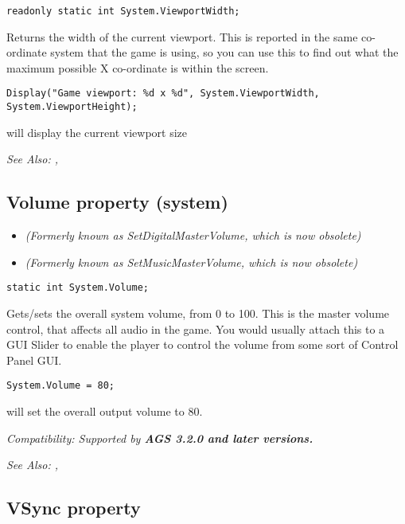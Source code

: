 \begin{verbatim}
readonly static int System.ViewportWidth;
\end{verbatim}
Returns the width of the current viewport. This is reported in the same co-ordinate system
that the game is using, so you can use this to find out what the maximum possible X co-ordinate
is within the screen.

\begin{verbatim}
Display("Game viewport: %d x %d", System.ViewportWidth, System.ViewportHeight);
\end{verbatim}
will display the current viewport size

\it{See Also:} ,


\subsection{Volume property (system)}\label{System.Volume}%

\begin{itemize}
\item \it{(Formerly known as SetDigitalMasterVolume, which is now obsolete)}
\item \it{(Formerly known as SetMusicMasterVolume, which is now obsolete)}
\end{itemize}

\begin{verbatim}
static int System.Volume;
\end{verbatim}
Gets/sets the overall system volume, from 0 to 100. This is the master volume control, that
affects all audio in the game. You would usually attach this to a GUI Slider to enable the
player to control the volume from some sort of Control Panel GUI.

\begin{verbatim}
System.Volume = 80;
\end{verbatim}
will set the overall output volume to 80.

\it{Compatibility:} Supported by \bf{AGS 3.2.0} and later versions.

\it{See Also:} ,


\subsection{VSync property}\label{System.VSync}%

